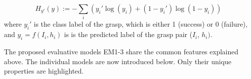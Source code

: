 \begin{equation}
H_{y'}(y) := - \sum_{i} ({y_i' \log(y_i) + (1-y_i') \log (1-y_i)})
\label{equation:crossentropy}
\end{equation}
where $y_i'$ is the class label of the grasp, which is either 1 (success) or 0 (failure), and $y_i = f(I_i, h_i)$ is is the predicted label of the grasp pair ($I_i$, $h_i)$.

The proposed evaluative models EM1-3 share the common features explained above. The individual models are now introduced below. Only their unique properties are highlighted.

\begin{figure}[t]
\centering




\end{figure}
